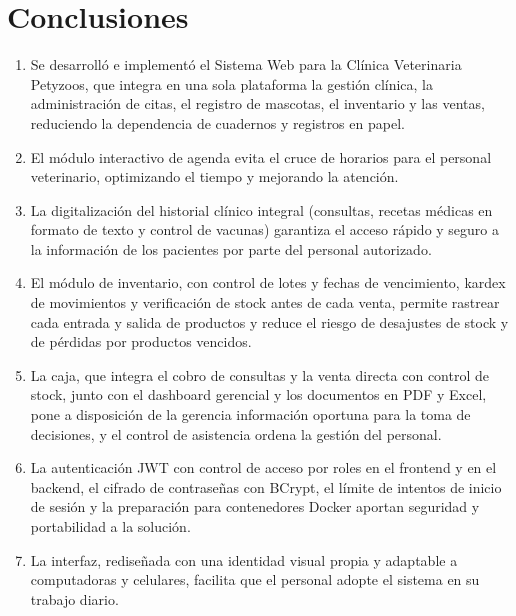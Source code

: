 \documentclass[11pt,a4paper]{report}
\begin{document}
\section{Conclusiones}
\begin{enumerate}[label=C\arabic*.]
\item Se desarrolló e implementó el Sistema Web para la Clínica Veterinaria Petyzoos, que integra en una sola plataforma la gestión clínica, la administración de citas, el registro de mascotas, el inventario y las ventas, reduciendo la dependencia de cuadernos y registros en papel.
\item El módulo interactivo de agenda evita el cruce de horarios para el personal veterinario, optimizando el tiempo y mejorando la atención.
\item La digitalización del historial clínico integral (consultas, recetas médicas en formato de texto y control de vacunas) garantiza el acceso rápido y seguro a la información de los pacientes por parte del personal autorizado.
\item El módulo de inventario, con control de lotes y fechas de vencimiento, kardex de movimientos y verificación de stock antes de cada venta, permite rastrear cada entrada y salida de productos y reduce el riesgo de desajustes de stock y de pérdidas por productos vencidos.
\item La caja, que integra el cobro de consultas y la venta directa con control de stock, junto con el dashboard gerencial y los documentos en PDF y Excel, pone a disposición de la gerencia información oportuna para la toma de decisiones, y el control de asistencia ordena la gestión del personal.
\item La autenticación JWT con control de acceso por roles en el frontend y en el backend, el cifrado de contraseñas con BCrypt, el límite de intentos de inicio de sesión y la preparación para contenedores Docker aportan seguridad y portabilidad a la solución.
\item La interfaz, rediseñada con una identidad visual propia y adaptable a computadoras y celulares, facilita que el personal adopte el sistema en su trabajo diario.
\end{enumerate}
\end{document}
